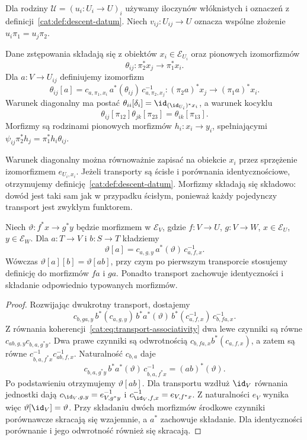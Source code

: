 Dla rodziny $\mathcal U=(u_i:U_i\to U)_i$ używamy iloczynów włóknistych i oznaczeń z definicji~\ref{cat:def:descent-datum}. Niech $v_{ij}:U_{ij}\to U$ oznacza wspólne złożenie $u_i\pi_1=u_j\pi_2$.

\begin{definicja}\label{cat:def:fibered-descent}
Dane zstępowania składają się z obiektów $x_i\in\mathcal E_{U_i}$ oraz pionowych izomorfizmów
\[
 \theta_{ij}:\pi_2^*x_j\longrightarrow\pi_1^*x_i.
\]
Dla $a:V\to U_{ij}$ definiujemy izomorfizm
\[
 \theta_{ij}[a]=c_{a,\pi_1,x_i}\,a^*(\theta_{ij})\,
                         c_{a,\pi_2,x_j}^{-1}
 :(\pi_2a)^*x_j\longrightarrow(\pi_1a)^*x_i.
\]
Warunek diagonalny ma postać $\theta_{ii}[\delta_i]=\id_{(\id_{U_i})^*x_i}$, a warunek kocyklu
\[
 \theta_{ij}[\pi_{12}]\theta_{jk}[\pi_{23}]
 =\theta_{ik}[\pi_{13}].
\]
Morfizmy są rodzinami pionowych morfizmów $h_i:x_i\to y_i$, spełniającymi $\psi_{ij}\pi_2^*h_j=\pi_1^*h_i\theta_{ij}$.
\end{definicja}

Warunek diagonalny można równoważnie zapisać na obiekcie $x_i$ przez sprzężenie izomorfizmem $e_{U_i,x_i}$. Jeżeli transporty są ścisłe i porównania identycznościowe, otrzymujemy definicję~\ref{cat:def:descent-datum}. Morfizmy składają się składowo: dowód jest taki sam jak w przypadku ścisłym, ponieważ każdy pojedynczy transport jest zwykłym funktorem.

\begin{stwierdzenie}\label{cat:prop:descent-transport-coherence}
Niech $\vartheta:f^*x\to g^*y$ będzie morfizmem w $\mathcal E_V$, gdzie $f:V\to U$, $g:V\to W$, $x\in\mathcal E_U$, $y\in\mathcal E_W$. Dla $a:T\to V$ i $b:S\to T$ kładziemy
\[
 \vartheta[a]=c_{a,g,y}\,a^*(\vartheta)\,c_{a,f,x}^{-1}.
\]
Wówczas $\vartheta[a][b]=\vartheta[ab]$, przy czym po pierwszym transporcie stosujemy definicję do morfizmów $fa$ i $ga$. Ponadto transport zachowuje identyczności i składanie odpowiednio typowanych morfizmów.
\end{stwierdzenie}
\begin{proof}
Rozwijając dwukrotny transport, dostajemy
\[
 c_{b,ga,y}\,b^*(c_{a,g,y})\,b^*a^*(\vartheta)\,
 b^*(c_{a,f,x}^{-1})\,c_{b,fa,x}^{-1}.
\]
Z równania koherencji~\eqref{cat:eq:transport-associativity} dwa lewe czynniki są równe $c_{ab,g,y}c_{b,a,g^*y}$. Dwa prawe czynniki są odwrotnością $c_{b,fa,x}b^*(c_{a,f,x})$, a zatem są równe $c_{b,a,f^*x}^{-1}c_{ab,f,x}^{-1}$. Naturalność $c_{b,a}$ daje
\[
 c_{b,a,g^*y}\,b^*a^*(\vartheta)\,c_{b,a,f^*x}^{-1}
 =(ab)^*(\vartheta).
\]
Po podstawieniu otrzymujemy $\vartheta[ab]$. Dla transportu wzdłuż $\id_V$ równania jednostki dają $c_{\id_V,g,y}=e_{V,g^*y}^{-1}$ i $c_{\id_V,f,x}^{-1}=e_{V,f^*x}$. Z naturalności $e_V$ wynika więc $\vartheta[\id_V]=\vartheta$. Przy składaniu dwóch morfizmów środkowe czynniki porównawcze skracają się wzajemnie, a $a^*$ zachowuje składanie. Dla identyczności porównanie i jego odwrotność również się skracają.
\end{proof}

